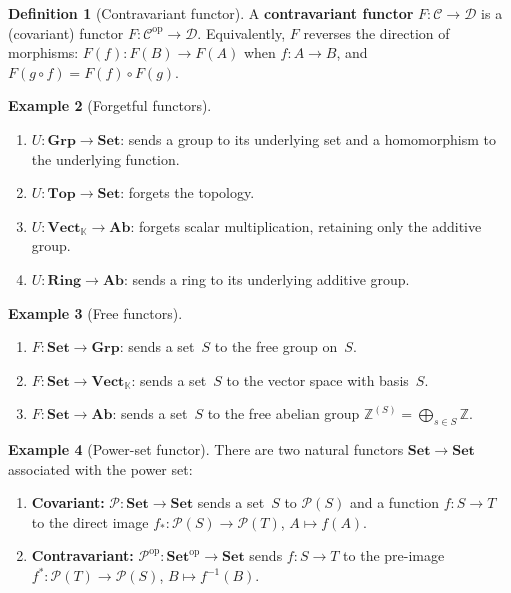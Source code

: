 \documentclass[a4paper,12pt]{book}
\newcommand{\Set}{\mathbf{Set}}
\newcommand{\Grp}{\mathbf{Grp}}
\newcommand{\Ab}{\mathbf{Ab}}
\newcommand{\Ring}{\mathbf{Ring}}
\newcommand{\Top}{\mathbf{Top}}
\newcommand{\Vect}{\mathbf{Vect}}
\newcommand{\op}{\mathrm{op}}
\newcommand{\Z}{\mathbb{Z}}
\newcommand{\K}{\mathbb{K}}
\theoremstyle{definition}
\newtheorem{definition}{Definition}[section]
\newtheorem{example}[definition]{Example}
\theoremstyle{plain}
\theoremstyle{remark}
\begin{document}
\begin{definition}[Contravariant functor]\label{def:contravariant}
A \textbf{contravariant functor} $F\colon\mathcal{C}\to\mathcal{D}$ is
a (covariant) functor $F\colon\mathcal{C}^{\op}\to\mathcal{D}$.
Equivalently, $F$ reverses the direction of morphisms:
$F(f)\colon F(B)\to F(A)$ when $f\colon A\to B$, and
$F(g\circ f) = F(f)\circ F(g)$.
\end{definition}

\begin{example}[Forgetful functors]\label{ex:forgetful}
\begin{enumerate}[label=(\roman*)]
    \item $U\colon\Grp\to\Set$: sends a group to its underlying set
          and a homomorphism to the underlying function.
    \item $U\colon\Top\to\Set$: forgets the topology.
    \item $U\colon\Vect_\K\to\Ab$: forgets scalar multiplication,
          retaining only the additive group.
    \item $U\colon\Ring\to\Ab$: sends a ring to its underlying
          additive group.
\end{enumerate}
\end{example}

\begin{example}[Free functors]\label{ex:free-functor}
\begin{enumerate}[label=(\roman*)]
    \item $F\colon\Set\to\Grp$: sends a set~$S$ to the free group on~$S$.
    \item $F\colon\Set\to\Vect_\K$: sends a set~$S$ to the vector
          space with basis~$S$.
    \item $F\colon\Set\to\Ab$: sends a set~$S$ to the free abelian
          group $\Z^{(S)} = \bigoplus_{s\in S}\Z$.
\end{enumerate}
\end{example}

\begin{example}[Power-set functor]\label{ex:powerset-functor}
There are two natural functors $\Set\to\Set$ associated with the power
set:
\begin{enumerate}[label=(\roman*)]
    \item \textbf{Covariant:} $\mathcal{P}\colon\Set\to\Set$ sends a
          set~$S$ to $\mathcal{P}(S)$ and a function $f\colon S\to T$
          to the direct image $f_*\colon \mathcal{P}(S)\to\mathcal{P}(T)$,
          $A\mapsto f(A)$.
    \item \textbf{Contravariant:} $\mathcal{P}^{\op}\colon\Set^{\op}\to\Set$
          sends $f\colon S\to T$ to the pre-image
          $f^*\colon\mathcal{P}(T)\to\mathcal{P}(S)$,
          $B\mapsto f^{-1}(B)$.
\end{enumerate}
\end{example}
\end{document}
